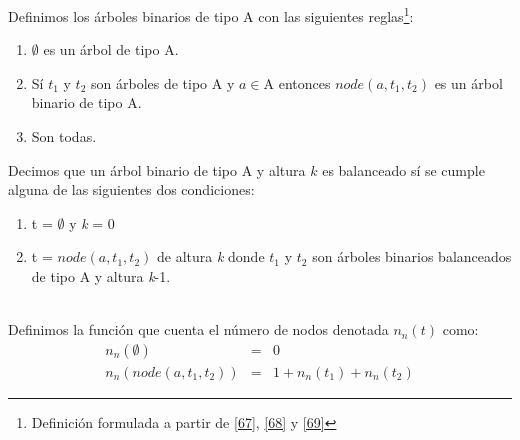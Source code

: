     \begin{definition}
        Definimos los árboles binarios de tipo A con las siguientes reglas\footnote{Definición formulada a partir de \hyperlink{67}{[67]}, \hyperlink{68}{[68]} y \hyperlink{69}{[69]}}:

        \begin{enumerate}
            \item $\emptyset$ es un árbol de tipo A.
            \item Sí  $t_1$ y $t_2$ son árboles de tipo A y $a \in $A  entonces  $node(a,t_1,t_2)$ es un árbol binario de tipo A.
            \item Son todas.
        \end{enumerate} 

        \bigskip


        Decimos que un árbol binario de tipo A y altura $k$ es balanceado sí se cumple alguna de las siguientes dos condiciones:\\

        \begin{enumerate}
            \item t = $\emptyset$ y \textit{k} = 0 
            \item t = $node(a,t_1,t_2)$ de altura \textit{k} donde $t_1$ y $t_2$ son árboles binarios balanceados de tipo A y altura \textit{k}-1. \\\
        \end{enumerate}


        Definimos la función que cuenta el número de nodos denotada $n_n(t)$ como:
        \[
            \begin{array}{rcl}
                 n_n(\emptyset)     &  =  & 0  \\
                 n_n(node(a,t_1,t_2))&  =  &1+ n_n(t_1)+n_n(t_2) 
            \end{array}
        \]

    \end{definition}

